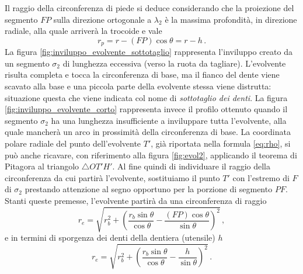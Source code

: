\noindent Il raggio della circonferenza di piede si deduce considerando che
la proiezione del segmento $FP$ sulla direzione ortogonale a $\lambda_2$
\`e la massima profondit\`a, in direzione radiale, alla quale arriver\`a
la trocoide e vale
\begin{equation}
r_p = r - (FP)\cos\theta = r - h\,.
\label{eq:r_p}
\end{equation}
\noindent La figura \ref{fig:inviluppo_evolvente_sottotaglio} rappresenta
l'inviluppo creato da un segmento $\sigma_2$ di lunghezza eccessiva (verso
la ruota da tagliare). L'evolvente risulta completa e tocca
la circonferenza di base, ma il fianco del dente viene scavato alla base e
una piccola parte della evolvente stessa viene distrutta: 
situazione questa che viene indicata col nome di {\em sottotaglio dei
denti}. 
La figura \ref{fig:inviluppo_evolvente_corto} rappresenta invece il
profilo ottenuto quando il segmento $\sigma_2$ ha una lunghezza insufficiente
a inviluppare tutta l'evolvente, alla quale mancher\`a un arco in prossimit\`a
della circonferenza di base.  La coordinata
polare radiale del punto dell'evolvente $T'$, gi\`a riportata
nella formula \ref{eq:rho}, si pu\`o anche ricavare, 
con riferimento alla figura  \ref{fig:evol2}, applicando
il teorema di Pitagora al triangolo $\triangle OT'H'$. 
Al fine quindi di individuare il raggio della circonferenza da cui partir\`a
l'evolvente, sostituiamo il
punto $T'$ con l'estremo di $F$ di $\sigma_2$ prestando attenzione
al segno opportuno per la porzione di segmento $PF$.
Stanti queste premesse, l'evolvente partir\`a da una circonferenza di raggio 
\begin{equation}
r_e = \sqrt{r_b^2 +\left(\frac{r_b\sin\theta}{\cos\theta}-\frac{(FP)\cos\theta}{\sin\theta}\right)^2}\,,
\label{eq:ini_evo}
\end{equation}
\noindent e in termini di sporgenza dei denti della dentiera (utensile) $h$
\begin{equation}
r_e = \sqrt{r_b^2 +\left(\frac{r_b\sin\theta}{\cos\theta}-\frac{h}{\sin\theta}\right)^2}\,.
\label{eq:ini_evoh}
\end{equation}

